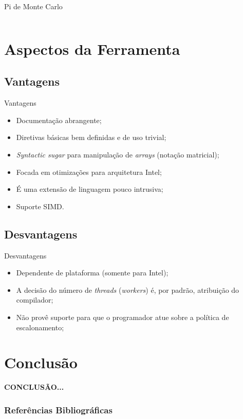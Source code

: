 \documentclass{beamer}
\begin{document}
\begin{frame}{Pi de Monte Carlo}
\begin{columns}
\end{columns}
\end{frame}

\section{Aspectos da Ferramenta}
\subsection{Vantagens}
\begin{frame}{Vantagens}
\begin{itemize}
	\item Documentação abrangente;
    \item Diretivas básicas bem definidas e de uso trivial;
    \item \textit{Syntactic sugar} para manipulação de \textit{arrays} (notação matricial);
    \item Focada em otimizações para arquitetura Intel;
    \item É uma extensão de linguagem pouco intrusiva;
    \item Suporte SIMD.
\end{itemize}
\end{frame}

\subsection{Desvantagens}
\begin{frame}{Desvantagens}
\begin{itemize}
    \item Dependente de plataforma (somente para Intel);
	\item A decisão do número de \textit{threads} (\textit{workers}) é, por padrão, atribuição do compilador;
	\item Não provê suporte para que o programador atue sobre a política de escalonamento;
\end{itemize}

\end{frame}

\section{Conclusão}
\begin{frame}[plain]
\begin{center}
\huge \textbf{CONCLUSÃO...}
\end{center}
\end{frame}

\begin{frame}%
    \frametitle{Referências Bibliográficas}
    \tiny{}
    
\end{frame}
\end{document}
